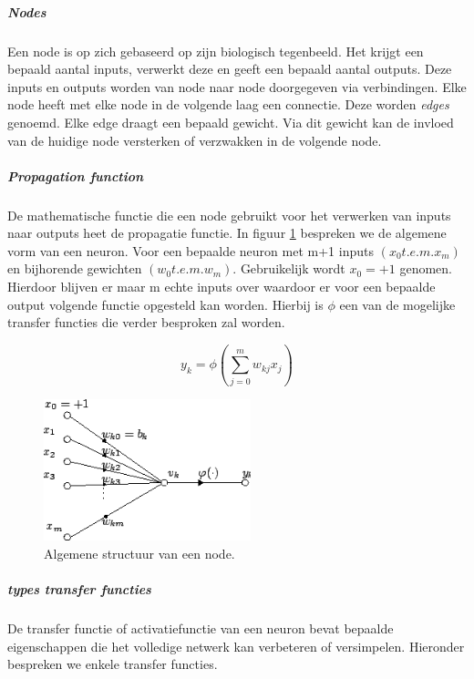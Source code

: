 			\subparagraph{Nodes}
			Een node is op zich gebaseerd op zijn biologisch tegenbeeld. Het krijgt een bepaald aantal inputs, verwerkt deze en geeft een bepaald aantal outputs. Deze inputs en outputs worden van node naar node doorgegeven via verbindingen. Elke node heeft met elke node in de volgende laag een connectie. Deze worden \textit{edges} genoemd. Elke edge draagt een bepaald gewicht. Via dit gewicht kan de invloed van de  huidige node versterken of verzwakken in de volgende node.
	
			\subparagraph{Propagation function}
			De mathematische functie die een node gebruikt voor het verwerken van inputs naar outputs heet de propagatie functie.
			In figuur \ref{fig:artificial_neuron} bespreken we de algemene vorm van een neuron. 
			Voor een bepaalde neuron met m+1 inputs $\left(  x_0 t.e.m. x_m \right) $ en bijhorende gewichten $\left(  w_0 t.e.m. w_m \right) $.
			Gebruikelijk wordt $x_0 = +1$ genomen. Hierdoor blijven er maar m echte inputs over waardoor er voor een bepaalde output volgende functie opgesteld kan worden. Hierbij is $\phi$ een van de mogelijke transfer functies die verder besproken zal worden.

			\begin{equation}
				y_k = \phi \left( \sum_{j=0}^{m}w_{kj}x_j\right) 
			\end{equation}
			
			\begin{figure}
				\centering
				\includegraphics[width=60mm]{afbeeldingen/Artificial_neuron.PNG}
				\caption{Algemene structuur van een node.}
				\label{fig:artificial_neuron}
			\end{figure}
			
			\subparagraph{types transfer functies}
			De transfer functie of activatiefunctie van een neuron bevat bepaalde eigenschappen die het volledige netwerk kan verbeteren of versimpelen. Hieronder bespreken we enkele transfer functies.
			
